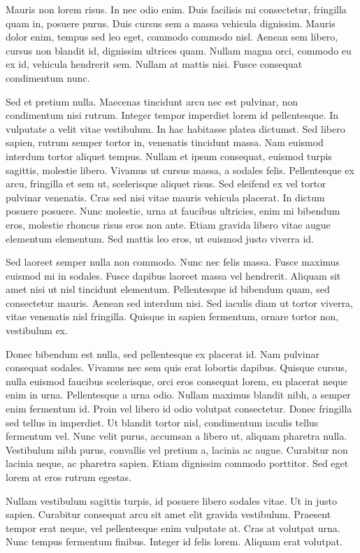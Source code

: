 Mauris non lorem risus. In nec odio enim. Duis facilisis mi consectetur, fringilla quam in, posuere purus. Duis cursus sem a massa vehicula dignissim. Mauris dolor enim, tempus sed leo eget, commodo commodo nisl. Aenean sem libero, cursus non blandit id, dignissim ultrices quam. Nullam magna orci, commodo eu ex id, vehicula hendrerit sem. Nullam at mattis nisi. Fusce consequat condimentum nunc.

Sed et pretium nulla. Maecenas tincidunt arcu nec est pulvinar, non condimentum nisi rutrum. Integer tempor imperdiet lorem id pellentesque. In vulputate a velit vitae vestibulum. In hac habitasse platea dictumst. Sed libero sapien, rutrum semper tortor in, venenatis tincidunt massa. Nam euismod interdum tortor aliquet tempus. Nullam et ipsum consequat, euismod turpis sagittis, molestie libero. Vivamus ut cursus massa, a sodales felis. Pellentesque ex arcu, fringilla et sem ut, scelerisque aliquet risus. Sed eleifend ex vel tortor pulvinar venenatis. Cras sed nisi vitae mauris vehicula placerat. In dictum posuere posuere. Nunc molestie, urna at faucibus ultricies, enim mi bibendum eros, molestie rhoncus risus eros non ante. Etiam gravida libero vitae augue elementum elementum. Sed mattis leo eros, ut euismod justo viverra id.

Sed laoreet semper nulla non commodo. Nunc nec felis massa. Fusce maximus euismod mi in sodales. Fusce dapibus laoreet massa vel hendrerit. Aliquam sit amet nisi ut nisl tincidunt elementum. Pellentesque id bibendum quam, sed consectetur mauris. Aenean sed interdum nisi. Sed iaculis diam ut tortor viverra, vitae venenatis nisl fringilla. Quisque in sapien fermentum, ornare tortor non, vestibulum ex.

Donec bibendum est nulla, sed pellentesque ex placerat id. Nam pulvinar consequat sodales. Vivamus nec sem quis erat lobortis dapibus. Quisque cursus, nulla euismod faucibus scelerisque, orci eros consequat lorem, eu placerat neque enim in urna. Pellentesque a urna odio. Nullam maximus blandit nibh, a semper enim fermentum id. Proin vel libero id odio volutpat consectetur. Donec fringilla sed tellus in imperdiet. Ut blandit tortor nisl, condimentum iaculis tellus fermentum vel. Nunc velit purus, accumsan a libero ut, aliquam pharetra nulla. Vestibulum nibh purus, convallis vel pretium a, lacinia ac augue. Curabitur non lacinia neque, ac pharetra sapien. Etiam dignissim commodo porttitor. Sed eget lorem at eros rutrum egestas.

Nullam vestibulum sagittis turpis, id posuere libero sodales vitae. Ut in justo sapien. Curabitur consequat arcu sit amet elit gravida vestibulum. Praesent tempor erat neque, vel pellentesque enim vulputate at. Cras at volutpat urna. Nunc tempus fermentum finibus. Integer id felis lorem. Aliquam erat volutpat.


